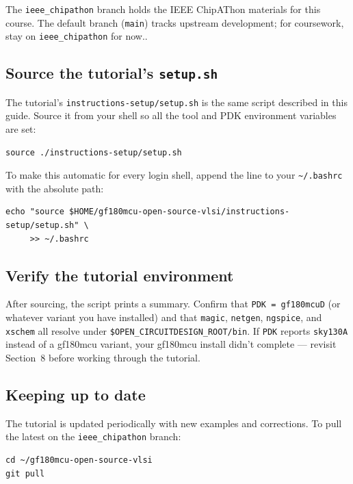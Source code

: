 \documentclass[11pt]{article}
\begin{document}
\noindent The \texttt{ieee\_chipathon} branch holds the IEEE ChipAThon
materials for this course. The default branch (\texttt{main}) tracks
upstream development; for coursework, stay on
\texttt{ieee\_chipathon} for now..

\subsection{Source the tutorial's \texttt{setup.sh}}

The tutorial's \texttt{instructions-setup/setup.sh} is the same script
described in this guide. Source it from your shell so all the tool and
PDK environment variables are set:

\begin{lstlisting}
source ./instructions-setup/setup.sh
\end{lstlisting}

\noindent To make this automatic for every login shell, append the line
to your \texttt{\textasciitilde/.bashrc} with the absolute path:

\begin{lstlisting}
echo "source $HOME/gf180mcu-open-source-vlsi/instructions-setup/setup.sh" \
     >> ~/.bashrc
\end{lstlisting}

\subsection{Verify the tutorial environment}

After sourcing, the script prints a summary. Confirm that
\texttt{PDK\,=\,gf180mcuD} (or whatever variant you have installed) and
that \texttt{magic}, \texttt{netgen}, \texttt{ngspice}, and
\texttt{xschem} all resolve under \texttt{\$OPEN\_CIRCUITDESIGN\_ROOT/bin}.
If \texttt{PDK} reports \texttt{sky130A} instead of a gf180mcu variant,
your gf180mcu install didn't complete --- revisit Section~8 before
working through the tutorial.

\subsection{Keeping up to date}

The tutorial is updated periodically with new examples and corrections.
To pull the latest on the \texttt{ieee\_chipathon} branch:

\begin{lstlisting}
cd ~/gf180mcu-open-source-vlsi
git pull
\end{lstlisting}
\end{document}
